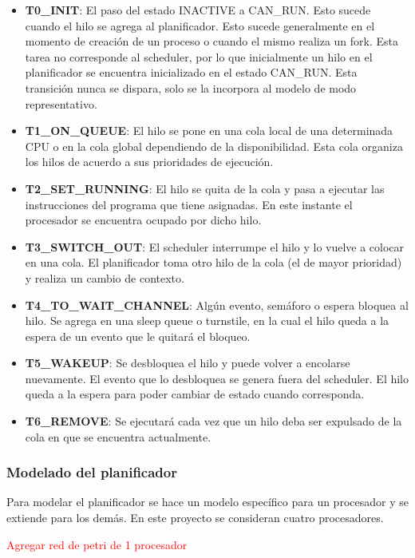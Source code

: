 \begin{itemize}
    \item \textbf{T0\_INIT}: El paso del estado INACTIVE a CAN\_RUN. Esto sucede cuando el hilo se agrega al planificador. Esto sucede generalmente en el momento de creación de un proceso o cuando el mismo realiza un fork. Esta tarea no corresponde al scheduler, por lo que inicialmente un hilo en el planificador se encuentra inicializado en el estado CAN\_RUN. Esta transición nunca se dispara, solo se la incorpora al modelo de modo representativo.
    \item \textbf{T1\_ON\_QUEUE}: El hilo se pone en una cola local de una determinada CPU o en la cola global dependiendo de la disponibilidad. Esta cola organiza los hilos de acuerdo a sus prioridades de ejecución.
    \item \textbf{T2\_SET\_RUNNING}: El hilo se quita de la cola y pasa a ejecutar las instrucciones del programa que tiene asignadas. En este instante el procesador se encuentra ocupado por dicho hilo.
    \item \textbf{T3\_SWITCH\_OUT}: El scheduler interrumpe el hilo y lo vuelve a colocar en una cola. El planificador toma otro hilo de la cola (el de mayor prioridad) y realiza un cambio de contexto.
    \item \textbf{T4\_TO\_WAIT\_CHANNEL}: Algún evento, semáforo o espera bloquea al hilo. Se agrega en una sleep queue o turnstile, en la cual el hilo queda a la espera de un evento que le quitará el bloqueo.
    \item \textbf{T5\_WAKEUP}: Se desbloquea el hilo y puede volver a encolarse nuevamente. El evento que lo desbloquea se genera fuera del scheduler. El hilo queda a la espera para poder cambiar de estado cuando corresponda.
    \item \textbf{T6\_REMOVE}: Se ejecutará cada vez que un hilo deba ser expulsado de la cola en que se encuentra actualmente.
\end{itemize}


\subsubsection{Modelado del planificador}

Para modelar el planificador se hace un modelo específico para un procesador y se extiende para los demás. En este proyecto se consideran cuatro procesadores.

\textcolor{red}{Agregar red de petri de 1 procesador}

